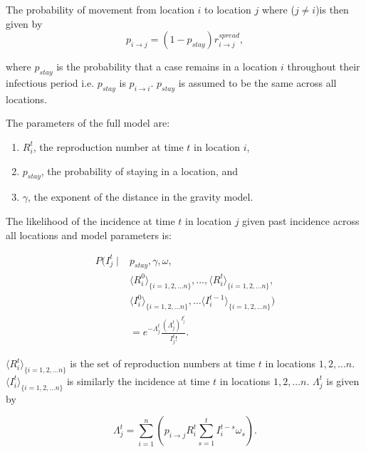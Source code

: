 \documentclass[9pt,twocolumn,twoside,lineno]{pnas-new}
\begin{document}
{The probability of movement from location \(i\) to location \(j\)
where ($j \neq i$)is
then given by 
\begin{equation*} 
p_{i \rightarrow j} = (1 - p_{stay}) r_{i \rightarrow j}^{spread},
\end{equation*}

where \(p_{stay}\) is the probability that a case remains in a location
\(i\) throughout their infectious period i.e. $p_{stay}$ is $p_{i
  \rightarrow i}$. \(p_{stay}\) is assumed to be
the same across all locations.

The parameters of the full model are:

\begin{enumerate}
\def\labelenumi{\arabic{enumi}.}
\item
  \(R_{i}^{t}\), the reproduction number at time \(t\) in location
  \(i\),
\item
  \(p_{stay}\), the probability of staying in a location, and
\item
  \(\gamma\), the exponent of the distance in the gravity model.
\end{enumerate}

The likelihood of the incidence at time \(t\) in location \(j\) given
past incidence across all locations and model parameters is:

\begin{equation*}
  \begin{aligned}
P ( 
I_{j}^{t} \mid 
& p_{stay}, \gamma, \omega, \\
& {\langle R_{i}^{0} \rangle}_{\{i = 1, 2, \dots n\}}, \hdots, {\langle R_{i}^{t} \rangle}_{\{i = 1, 2, \dots n\}}, \\
& {\langle I_{i}^{0} \rangle}_{\{i = 1, 2, \dots n\}}, \hdots {\langle I_{i}^{t-1} \rangle}_{\{i = 1, 2, \dots n\}} ) \\
& =  e^{-\Lambda_{j}^{t}}  \frac{ {\left( \Lambda_{j}^{t} \right)}^{I_{j}^{t}}}{I_{j}^{t} !}.
\end{aligned}
\end{equation*}

\({\langle R_{i}^{t} \rangle}_{\{i = 1, 2, \dots n\}}\) is the set of
reproduction numbers at time \(t\) in locations \(1, 2, \dots n\).
\({\langle I_{i}^{t} \rangle}_{\{i = 1, 2, \dots n\}}\) is similarly the
incidence at time \(t\) in locations \(1, 2, \dots
n\). \(\Lambda_{j}^{t}\) is given by

\begin{equation}
\Lambda_{j}^{t} = \sum\limits_{i = 1}^n{\left(p_{i \rightarrow j}R_{i}^{t} \sum_{s
        = 1}^t{I_{i}^{t - s} \omega_{s}} \right)}.
\label{eq:lambdajt}
\end{equation} 

}
\end{document}
